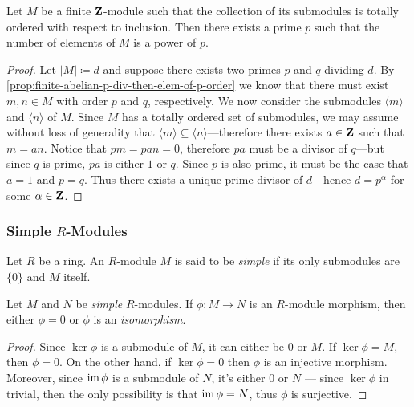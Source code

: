\begin{example}
    \label{exp:totally-ordered-submodules-prime-division}
    Let \(M\) be a finite \(\mathbf{Z}\)-module such that the collection of its submodules
    is totally ordered with respect to inclusion. Then there exists a prime \(p\)
    such that the number of elements of \(M\) is a power of \(p\).

    \begin{proof}
        Let \(|M| \coloneq d\) and suppose there exists two primes \(p\) and \(q\)
        dividing \(d\). By \cref{prop:finite-abelian-p-div-then-elem-of-p-order} we know
        that there must exist \(m, n \in M\) with order \(p\) and \(q\),
        respectively. We now consider the submodules \(\langle m \rangle\) and
        \(\langle n \rangle\) of \(M\). Since \(M\) has a totally ordered set of
        submodules, we may assume without loss of generality that
        \(\langle m \rangle \subseteq \langle n \rangle\)---therefore there exists \(a
        \in \mathbf{Z}\) such that \(m = a n\). Notice that \(p m = p a n = 0\), therefore \(p
        a\) must be a divisor of \(q\)---but since \(q\) is prime, \(p a\) is either
        \(1\) or \(q\). Since \(p\) is also prime, it must be the case that \(a = 1\)
        and \(p = q\). Thus there exists a unique prime divisor of \(d\)---hence \(d =
        p^{\alpha}\) for some \(\alpha \in \mathbf{Z}\).
    \end{proof}
\end{example}

\subsubsection{Simple \texorpdfstring{\(R\)}{R}-Modules}

\begin{definition}
    \label{def:simple-module}
    Let \(R\) be a ring. An \(R\)-module \(M\) is said to be \emph{simple} if its
    only submodules are \(\{0\}\) and \(M\) itself.
\end{definition}

\begin{lemma}[Schur's]
    \label{lem:schur-lemma}
    Let \(M\) and \(N\) be \emph{simple} \(R\)-modules. If \(\phi: M \to N\) is an
    \(R\)-module morphism, then either \(\phi = 0\) or \(\phi\) is an
    \emph{isomorphism}.
\end{lemma}

\begin{proof}
    Since \(\ker \phi\) is a submodule of \(M\), it can either be \(0\) or \(M\). If
    \(\ker \phi = M\), then \(\phi = 0\). On the other hand, if \(\ker \phi = 0\)
    then \(\phi\) is an injective morphism. Moreover, since \(\operatorname{im} \phi\) is a
    submodule of \(N\), it's either \(0\) or \(N\) --- since \(\ker \phi\) in
    trivial, then the only possibility is that \(\operatorname{im} \phi = N\), thus \(\phi\) is
    surjective.
\end{proof}

